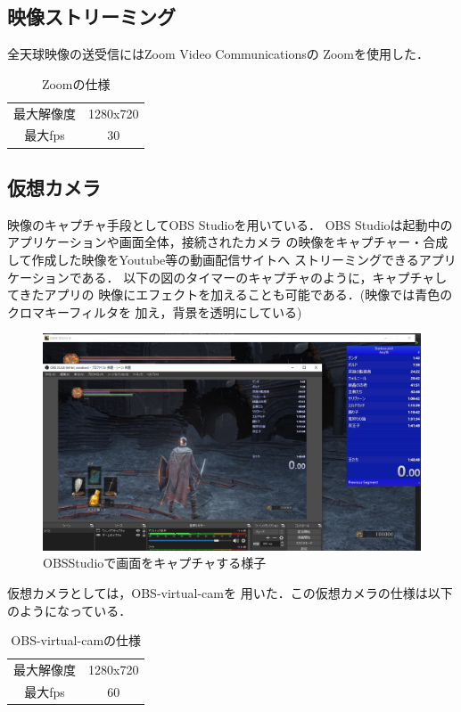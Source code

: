 \subsection*{映像ストリーミング}
全天球映像の送受信にはZoom Video Communicationsの
Zoom\cite{1}を使用した．

\begin{table}[tbp]
  \begin{center}
  \begin{tabular}{cc}
  最大解像度 & 1280x720 \\
  最大fps & 30      
  \end{tabular}
  \caption{Zoomの仕様}
  \end{center}
  \end{table}

\subsection*{仮想カメラ}
映像のキャプチャ手段としてOBS Studio\cite{9}を用いている．
OBS Studioは起動中のアプリケーションや画面全体，接続されたカメラ
の映像をキャプチャー・合成して作成した映像をYoutube等の動画配信サイトへ
ストリーミングできるアプリケーションである．
以下の図のタイマーのキャプチャのように，キャプチャしてきたアプリの
映像にエフェクトを加えることも可能である．(映像では青色のクロマキーフィルタを
加え，背景を透明にしている)

\begin{figure}[tbp]
  \centering
  \includegraphics[scale=0.4]{fig/OBSstudio.png}
  \caption{OBSStudioで画面をキャプチャする様子}
\end{figure}

仮想カメラとしては，OBS-virtual-cam\cite{7}を
用いた．この仮想カメラの仕様は以下のようになっている．
 

\begin{table}[tbp]
  \begin{center}
  \begin{tabular}{cc}
  最大解像度 & 1280x720 \\
  最大fps & 60      
  \end{tabular}
  \caption{OBS-virtual-camの仕様}
  \end{center}
  \end{table}

